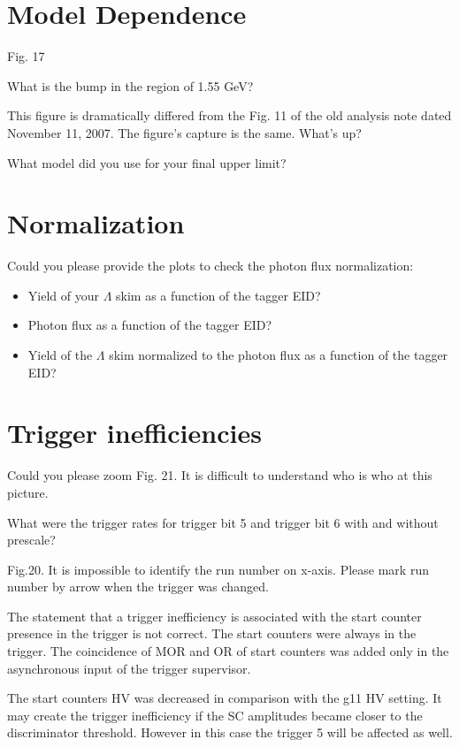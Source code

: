 \documentclass[12pt]{article}
\begin{document}
\section*{Model Dependence}
Fig. 17

What is the bump in the region of 1.55 GeV?

This figure is dramatically differed from the Fig. 11 of the old analysis note dated November 11, 2007.
The figure's capture is the same. What's up?

What model did you use for your final upper limit? 


\section*{Normalization}

Could you please provide the plots to check the photon flux normalization:
\begin{itemize}
\item{} Yield of your $\Lambda$ skim  as a function of the tagger EID? 
\item{}  Photon flux as a function of the tagger EID? 
\item{}  Yield of the $\Lambda$ skim normalized to the photon flux as a function of the tagger EID? 
\end{itemize}

\section*{Trigger inefficiencies}
Could you please zoom Fig. 21. It is difficult to understand who is who at this picture.

What were the trigger rates for trigger bit 5 and trigger bit 6 with and without prescale?

Fig.20. It is impossible to identify the run number on x-axis. Please mark run number by arrow
when the trigger was changed.

The statement that a trigger inefficiency is associated with the start counter presence in the trigger is not correct. The start counters were always in the trigger. The coincidence of MOR and OR of start counters was added only in the asynchronous  input of the trigger supervisor. 

The start counters HV was decreased in comparison with the g11 HV setting. It may create the trigger inefficiency if the SC amplitudes became closer to the discriminator threshold. However in this case the trigger 5 will be affected as well. 
\end{document}
